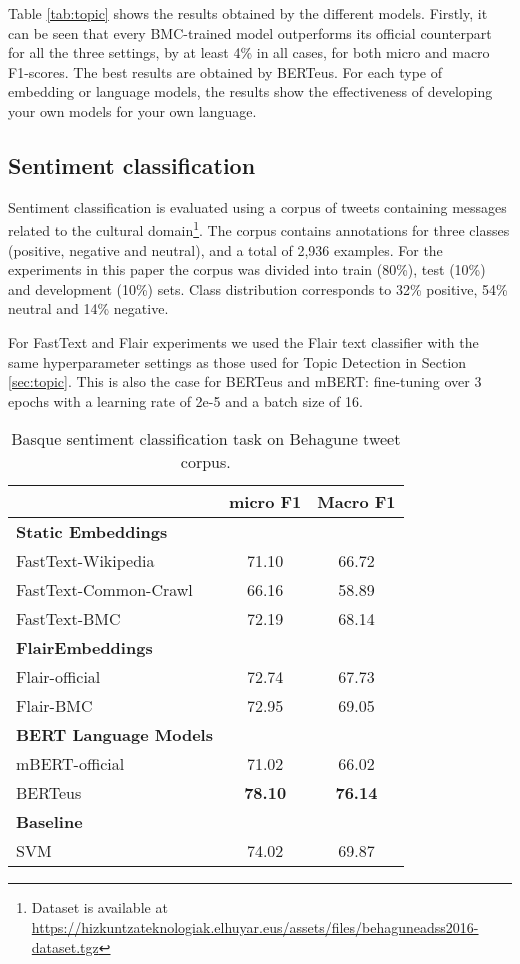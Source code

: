 \documentclass[10pt, a4paper]{article}
\begin{document}
Table \ref{tab:topic} shows the results obtained by the different models. Firstly, it can be seen that every BMC-trained model outperforms its official counterpart for all the three settings, by at least 4\% in all cases, for both micro and macro F1-scores. The best results are obtained by BERTeus. For each type of embedding or language models, the results show the effectiveness of developing your own models for your own language.

\subsection{Sentiment classification}\label{sec:polarity}

Sentiment classification is evaluated using a corpus of tweets containing messages related to the cultural domain\footnote{Dataset is available at \scriptsize{\url{https://hizkuntzateknologiak.elhuyar.eus/assets/files/behaguneadss2016-dataset.tgz}}}. The corpus contains annotations for three classes (positive, negative and neutral), and a total of 2,936 examples. For the experiments in this paper the corpus was divided into train (80\%), test (10\%) and development (10\%) sets. Class distribution corresponds to 32\% positive, 54\% neutral and 14\% negative.

For FastText and Flair experiments we used the Flair text classifier with the same hyperparameter settings as those used for Topic Detection in Section \ref{sec:topic}. This is also the case for BERTeus and mBERT: fine-tuning over 3 epochs with a learning rate of 2e-5 and a batch size of 16.

\begin{table}[!ht]\small
\centering
\begin{tabular}{@{\hspace{0.3cm}}lcc} \hline
 {\textbf{}} & {\textbf{micro F1}} &  {\textbf{Macro F1}} \\ \hline
\textbf{Static Embeddings} & & \\
FastText-Wikipedia & 71.10 &	66.72 \\
FastText-Common-Crawl & 66.16 & 58.89  \\
FastText-BMC  & 72.19 &	68.14 \\
\hline%
\textbf{FlairEmbeddings}\\
Flair-official & 72.74 & 67.73 \\
Flair-BMC  & 72.95	& 69.05 \\ \hline
\textbf{BERT Language Models}\\
mBERT-official  & 71.02 & 66.02 \\
BERTeus  & \textbf{78.10}	& \textbf{76.14} \\
\hline
\textbf{Baseline} \\
SVM \cite{san2019multilingual} & 74.02 & 69.87\\ \hline
\end{tabular}
\caption{Basque sentiment classification task on Behagune tweet corpus.}\label{tab:sentiment}
\end{table}
\end{document}
